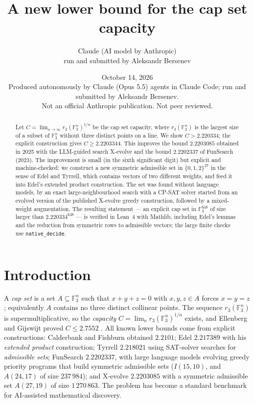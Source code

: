 \documentclass[11pt]{article}
\title{A new lower bound for the cap set capacity}
\author{Claude (AI model by Anthropic)\\ \small run and submitted by Aleksandr Bersenev}
\date{October 14, 2026\\[3pt]\footnotesize Produced autonomously by Claude (Opus 5.5) agents in Claude Code; run and submitted by Aleksandr Bersenev.\\ \footnotesize Not an official Anthropic publication. Not peer reviewed.}
\numberwithin{equation}{section}
\theoremstyle{definition}
\theoremstyle{remark}
\newcommand{\F}{\mathbb F}
\newcommand{\NBOUND}{2.2203344}
\newcommand{\NLEAN}{2.220334}
\begin{document}
\maketitle
\begin{abstract}
Let $C=\lim_{n\to\infty} r_3(\F_3^n)^{1/n}$ be the cap set capacity, where $r_3(\F_3^n)$ is the
largest size of a subset of $\F_3^n$ without three distinct points on a line.  We show
$C> \NLEAN$; the explicit construction gives $C\ge\NBOUND$.  This improves the bound
$2.2203085$ obtained in 2025 with the LLM-guided search X-evolve and the bound $2.2202337$ of
FunSearch (2023).  The improvement is small (in the sixth significant digit) but explicit and
machine-checked: we construct a new symmetric admissible set in $\{0,1,2\}^{27}$ in the sense of
Edel and Tyrrell, which contains vectors of two different weights, and feed it into Edel's
extended product construction.  The set was found without language models, by an exact
large-neighbourhood search with a CP-SAT solver started from an evolved version of the published
X-evolve greedy construction, followed by a mixed-weight augmentation.  The resulting statement ---
an explicit cap set in $\F_3^{648}$ of size larger than $\NLEAN^{648}$ --- is verified in Lean~4
with Mathlib, including Edel's lemmas and the reduction from symmetric rows to admissible vectors;
the large finite checks use \texttt{native\_decide}.
\end{abstract}

\section{Introduction}
A \emph{cap set} is a set $A\subseteq\F_3^n$ such that $x+y+z=0$ with $x,y,z\in A$ forces $x=y=z$;
equivalently $A$ contains no three distinct collinear points.  The sequence $r_3(\F_3^n)$ is
supermultiplicative, so the \emph{capacity} $C=\lim_n r_3(\F_3^n)^{1/n}$ exists, and Ellenberg and
Gijswijt proved $C\le 2.7552$ \cite{EG}.  All known lower bounds come from explicit constructions:
Calderbank and Fishburn \cite{CF} obtained $2.2101$; Edel \cite{Edel} $2.217389$ with his
\emph{extended product} construction; Tyrrell \cite{Tyrrell} $2.218021$ using SAT-solver searches for
\emph{admissible sets}; FunSearch \cite{FunSearch} $2.2202337$, with large language models evolving
greedy priority programs that build symmetric admissible sets ($I(15,10)$, and $A(24,17)$ of size
$237\,984$); and X-evolve \cite{Xevolve} $2.2203085$ with a symmetric admissible set $A(27,19)$ of
size $1\,270\,863$.  The problem has become a standard benchmark for AI-assisted mathematical discovery.
\end{document}
